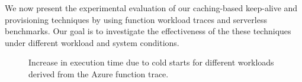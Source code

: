 \label{sec:eval}


We now present the experimental evaluation of our caching-based keep-alive and provisioning techniques by using function workload traces and serverless benchmarks.
Our goal is to investigate the effectiveness of the these techniques under different workload and system conditions. 


\begin{figure}
  \centering
    \vspace*{\myfigspace}
  \hfill 
\hfill 
  \vspace*{\myfigspace}
\caption{Increase in execution time due to cold starts for different workloads derived from the Azure function trace.}
\label{fig:exec-overheads-all}
  \vspace*{\myfigspace}
\end{figure}


